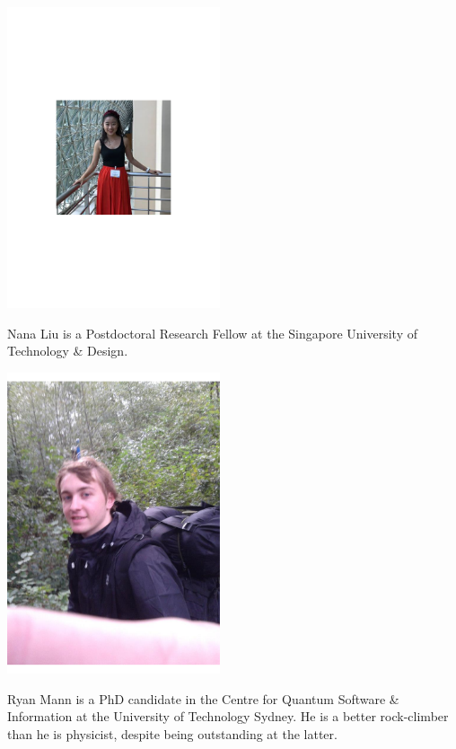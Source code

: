 \begin{center}
\includegraphics[width=0.47\textwidth]{photo_nana_liu}
\end{center}

Nana Liu is a Postdoctoral Research Fellow at the Singapore University of Technology \& Design.


%
%

\begin{center}
\includegraphics[width=0.47\textwidth]{photo_ryan_mann}
\end{center}

Ryan Mann is a PhD candidate in the Centre for Quantum Software \& Information at the University of Technology Sydney. He is a better rock-climber than he is physicist, despite being outstanding at the latter.


